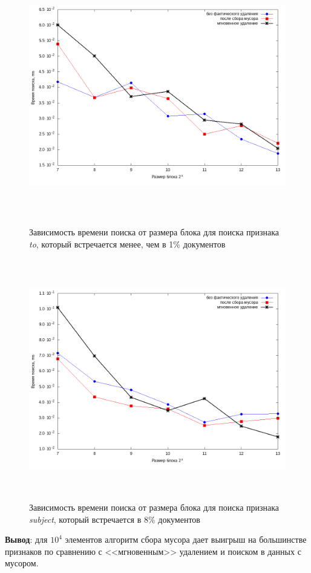 \begin{figure}[H]
\includegraphics[width=\linewidth, height=10.5cm]{fig/limit_1/1e4/to.png}
\caption{Зависимость времени поиска от размера блока для поиска признака \textit{to}, который встречается менее, чем в 1\% документов}
\includegraphics[width=\linewidth, height=10.5cm]{fig/limit_1/1e4/subject.png}
\caption{Зависимость времени поиска от размера блока для поиска признака \textit{subject}, который встречается в 8\% документов}
\end{figure}

\textbf{Вывод}: для $10^4$ элементов алгоритм сбора мусора дает выигрыш на большинстве признаков
по сравнению с <<мгновенным>> удалением и поиском в данных с мусором.

